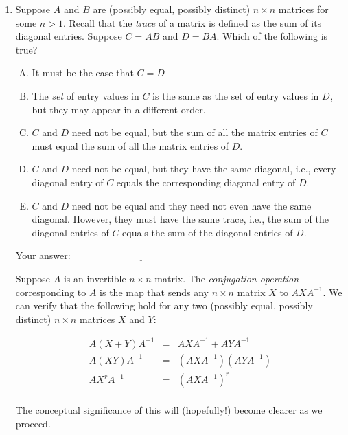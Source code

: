 \documentclass[10pt]{amsart}
\begin{document}
\begin{enumerate}

\item Suppose $A$ and $B$ are (possibly equal, possibly distinct) $n
  \times n$ matrices for some $n > 1$. Recall that the {\em trace} of
  a matrix is defined as the sum of its diagonal entries. Suppose $C =
  AB$ and $D = BA$. Which of the following is true?

  \begin{enumerate}[(A)]
  \item It must be the case that $C = D$
  \item The {\em set} of entry values in $C$ is the same as the set of
    entry values in $D$, but they may appear in a different order.
  \item $C$ and $D$ need not be equal, but the sum of all the matrix
    entries of $C$ must equal the sum of all the matrix entries of
    $D$.
  \item $C$ and $D$ need not be equal, but they have the same
    diagonal, i.e., every diagonal entry of $C$ equals the
    corresponding diagonal entry of $D$.
  \item $C$ and $D$ need not be equal and they need not even have the
    same diagonal. However, they must have the same trace, i.e., the
    sum of the diagonal entries of $C$ equals the sum of the diagonal
    entries of $D$.
  \end{enumerate}

  \vspace{0.1in}
  Your answer: $\underline{\qquad\qquad\qquad\qquad\qquad\qquad\qquad}$
  \vspace{0.1in}

  Suppose $A$ is an invertible $n \times n$ matrix. The {\em
    conjugation operation} corresponding to $A$ is the map that sends
  any $n \times n$ matrix $X$ to $AXA^{-1}$. We can verify that the
  following hold for any two (possibly equal, possibly distinct) $n
  \times n$ matrices $X$ and $Y$:

  \begin{eqnarray*}
    A(X + Y)A^{-1} & = &  AXA^{-1} + AYA^{-1}\\
    A(XY)A^{-1} & = & (AXA^{-1})(AYA^{-1})\\
    AX^rA^{-1} & = & (AXA^{-1})^r\\
  \end{eqnarray*}

  The conceptual significance of this will (hopefully!) become clearer
  as we proceed. 


\end{enumerate}
\end{document}
